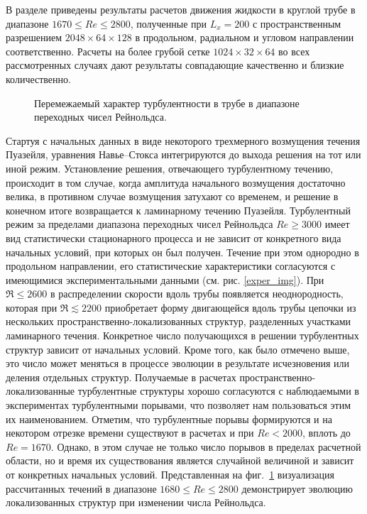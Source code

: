 В разделе приведены результаты расчетов движения жидкости в круглой трубе в диапазоне $1670\leqslant Re\leqslant 2800$, полученные при $L_x=200$ с пространственным разрешением $2048 \times 64 \times 128$ в продольном, радиальном и угловом направлении соответственно. Расчеты на более грубой сетке $1024\times32\times64$ во всех рассмотренных случаях дают результаты совпадающие качественно и близкие количественно.

\begin{figure}[h]
\caption{Перемежаемый характер турбулентности в трубе в диапазоне переходных чисел Рейнольдса.}
\label{puffs_img}
\end{figure}

Стартуя с начальных данных в виде некоторого трехмерного возмущения течения Пуазейля, уравнения Навье--Стокса интегрируются до выхода решения на тот или иной режим. Установление решения, отвечающего турбулентному течению, происходит в том случае, когда амплитуда начального возмущения достаточно велика, в противном случае возмущения затухают со временем, и решение в конечном итоге возвращается к ламинарному течению Пуазейля. Турбулентный режим за пределами диапазона переходных чисел Рейнольдса $Re\geqslant3000$ имеет вид статистически стационарного процесса и не зависит от конкретного вида начальных условий, при которых он был получен. Течение при этом однородно в продольном направлении, его статистические характеристики согласуются с имеющимися экспериментальными данными (см. рис. \ref{exper_img}). При $\Re\leqslant2600$ в распределении скорости вдоль трубы появляется неоднородность, которая при $\Re\lesssim2200$ приобретает форму двигающейся вдоль трубы цепочки из нескольких пространственно-локализованных структур, разделенных участками ламинарного течения. Конкретное число получающихся в решении турбулентных структур зависит от начальных условий. Кроме того, как было отмечено выше, это число может меняться в процессе эволюции в результате исчезновения или деления отдельных структур. Получаемые в расчетах пространственно-локализованные турбулентные структуры хорошо согласуются с наблюдаемыми в экспериментах турбулентными порывами, что позволяет нам пользоваться этим их наименованием. Отметим, что турбулентные порывы формируются и на некотором отрезке времени существуют в расчетах и при $Re<2000$, вплоть до $Re=1670$. Однако, в этом случае не только число порывов в пределах расчетной области, но и время их существования является случайной величиной и зависит от конкретных начальных условий. Представленная на фиг.~\ref{puffs_img} визуализация рассчитанных течений в диапазоне $1680\leqslant Re\leqslant2800$ демонстрирует эволюцию локализованных структур при изменении числа Рейнольдса.

